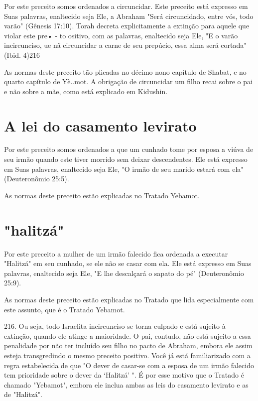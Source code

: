 \begin{itemize}
\begin{enumrate}
\begin{itemize}
\begin{itemize}
\begin{itemize}
Por este preceito somos ordenados a circuncidar. Este preceito está
expresso em Suas palavras, enaltecido seja Ele, a Abraham "Será
circuncidado, entre vós, todo varão" (Gênesis 17:10). Torah decreta
explicitamente a ex­tinção para aquele que violar este pre• - to
ositivo, com as palavras, enalteci­do seja Ele, "E o varão incircunciso,
ue nã circuncidar a carne de seu prepú­cio, essa alma será cortada"
(Ibid. 4)216

As normas deste preceito tão plicadas no décimo nono capítulo de Shabat,
e no quarto capítulo de Yè..mot. A obrigação de circuncidar um filho
recai sobre o pai e não sobre a mãe, como está explicado em Kidushin.

\section{A lei do casamento levirato}

Por este preceito somos ordenados a que um cunhado tome por es­posa a
viúva de seu irmão quando este tiver morrido sem deixar descendentes.
Ele está expresso em Suas palavras, enaltecido seja Ele, "O irmão de seu
mari­do estará com ela" (Deuteronômio 25:5).


As normas deste preceito estão explicadas no Tratado Yebamot.


\section{"halitzá"}

Por este preceito a mulher de um irmão falecido fica ordenada a
exe­cutar "Halitzá" em seu cunhado, se ele não se casar com ela. Ele
está expresso em Suas palavras, enaltecido seja Ele, "E lhe descalçará o
sapato do pé" (Deute­ronômio 25:9).

As normas deste preceito estão explicadas no Tratado que lida
espe­cialmente com este assunto, que é o Tratado Yebamot.

216. Ou seja, todo Israelita incircunciso se torna culpado e está
sujeito à extinção, quando ele atin­ge a maioridade. O pai, contudo, não
está sujeito a essa penalidade por não ter incluído seu filho no pacto
de Abraham, embora ele assim esteja transgredindo o mesmo preceito
positivo.
Você já está familiarizado com a regra estabelecida de que "O dever de
casar-se com a esposa de um irmão falecido tem prioridade sobre o dever
da `Halitzá' ". É por esse motivo que o Tratado é chamado "Yebamot",
embo­ra ele inclua ambas as leis do casamento levirato e as de
"Halitzá".


\end{itemize}
\end{itemize}
\end{itemize}
\end{enumrate}
\end{itemize}
